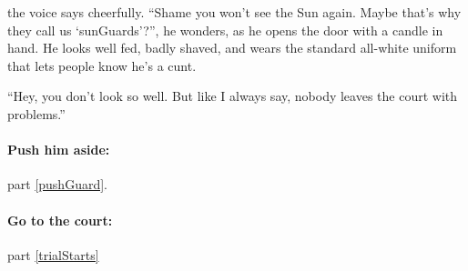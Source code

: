 the voice says cheerfully.
``Shame you won't see the Sun again.
Maybe that's why they call us `\glspl{sunGuard}'?'', he wonders, as he opens the door with a candle in hand.
He looks well fed, badly shaved, and wears the standard all-white uniform that lets people know he's a cunt.

``Hey, you don't look so well.
But like I always say, nobody leaves the \gls{court} with problems.''

\paragraph{Push him aside:}
part \vref{pushGuard}.

\paragraph{Go to the \gls{court}:}
part \vref{trialStarts}
